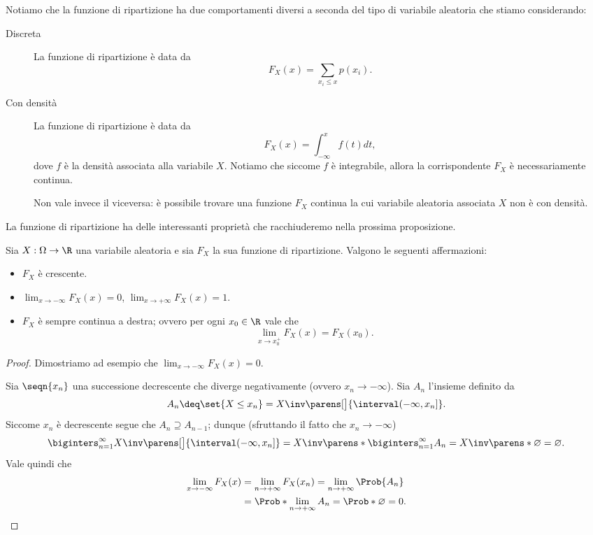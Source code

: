 Notiamo che la funzione di ripartizione ha due comportamenti diversi a seconda del tipo di variabile aleatoria che stiamo considerando: \begin{description}
    \item[Discreta] La funzione di ripartizione è data da \[
        F_X(x) = \sum_{x_i \leq x} p(x_i).    
    \]
    \item[Con densità] La funzione di ripartizione è data da \[
        F_X(x) = \int_{-\infty}^x f(t)dt,   
    \] dove $f$ è la densità associata alla variabile $X$.
    Notiamo che siccome $f$ è integrabile, allora la corrispondente $F_X$ è necessariamente continua.

    Non vale invece il viceversa: è possibile trovare una funzione $F_X$ continua la cui variabile aleatoria associata $X$ non è con densità.
\end{description}

La funzione di ripartizione ha delle interessanti proprietà che racchiuderemo nella prossima proposizione.
\begin{proposition}
    \label{prop:proprietà_cdf}
    Sia $X : \Omega \to \R$ una variabile aleatoria e sia $F_X$ la sua funzione di ripartizione. Valgono le seguenti affermazioni:
    \begin{itemize}
        \item $F_X$ è crescente.
        \item $\displaystyle\lim_{x \to -\infty} F_X(x) = 0$, $\displaystyle\lim_{x\to +\infty} F_X(x) = 1.$
        \item $F_X$ è sempre continua a destra; ovvero per ogni $x_0 \in \R$ vale che \[
            \lim_{x \to x_0^+} F_X(x) = F_X(x_0).    
        \]
    \end{itemize}
\end{proposition}
\begin{proof}
    Dimostriamo ad esempio che $\displaystyle\lim_{x \to -\infty} F_X(x) = 0$.

    Sia $\seqn{x_n}$ una successione decrescente che diverge negativamente (ovvero $x_n \to -\infty$).
    Sia $A_n$ l'insieme definito da \[
        A_n \deq \set{X \leq x_n} = X\inv\parens[\big]{\interval({-\infty, x_n}]}.
    \] Siccome $x_n$ è decrescente segue che $A_n \supseteq A_{n-1}$; dunque (sfruttando il fatto che $x_n \to -\infty$) \[
        \biginters_{n = 1}^\infty X\inv\parens[\big]{\interval({-\infty, x_n}]}
        =  X\inv\parens*{ \biginters_{n = 1}^\infty A_n }
        = X\inv\parens*{\varnothing}
        = \varnothing.
    \] Vale quindi che \[
        \lim_{x \to -\infty} F_X(x) 
        \begin{alignedat}[t]{1}
            &= \lim_{n \to +\infty} F_X(x_n)
            = \lim_{n \to +\infty} \Prob{A_n}\\
            &= \Prob*{\lim_{n\to +\infty} A_n}
            = \Prob*{\varnothing}
            = 0.    
        \end{alignedat} \tag*{\qedhere}
    \]
\end{proof}

